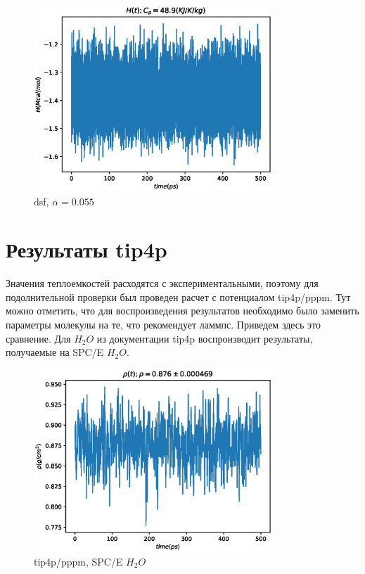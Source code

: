\documentclass[a4paper,12pt]{article} %
\begin{document}
\begin{figure}[h!]
\begin{center}
\includegraphics[width=0.8\textwidth]{./pics/e055H}
\end{center}
\caption{dsf, $\alpha = 0.055$} \label{img:pppm_H_N5}
\end{figure}

\newpage

\section{Результаты tip4p}

Значения теплоемкостей расходятся с экспериментальными, поэтому для подолнительной проверки был проведен расчет с потенциалом tip4p/pppm. Тут можно отметить, что для воспроизведения результатов необходимо было заменить параметры молекулы на те, что рекомендует ламмпс. Приведем здесь это сравнение. Для $H_2 O$ из документации tip4p воспроизводит результаты, получаемые на SPC/E $H_2 O$.

\newpage

\begin{figure}[h!]
\begin{center}
\includegraphics[width=0.8\textwidth]{./pics/stdrho}
\end{center}
\caption{tip4p/pppm, SPC/E $H_2 O$} \label{img:pppm_H_N5}
\end{figure}
\end{document}

